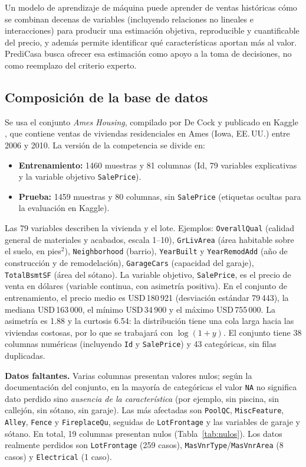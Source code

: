 \documentclass[journal]{IEEEtran}
\begin{document}
Un modelo de aprendizaje de máquina puede aprender de ventas históricas cómo se combinan decenas de variables (incluyendo relaciones no lineales e interacciones) para producir una estimación objetiva, reproducible y cuantificable del precio, y además permite identificar qué características aportan más al valor. PrediCasa busca ofrecer esa estimación como apoyo a la toma de decisiones, no como reemplazo del criterio experto.

\subsection{Composición de la base de datos}
Se usa el conjunto \textit{Ames Housing}, compilado por De Cock \cite{decock2011} y publicado en Kaggle \cite{kaggle}, que contiene ventas de viviendas residenciales en Ames (Iowa, EE.\,UU.) entre 2006 y 2010. La versión de la competencia se divide en:
\begin{itemize}
\item \textbf{Entrenamiento:} 1460 muestras y 81 columnas (Id, 79 variables explicativas y la variable objetivo \texttt{SalePrice}).
\item \textbf{Prueba:} 1459 muestras y 80 columnas, sin \texttt{SalePrice} (etiquetas ocultas para la evaluación en Kaggle).
\end{itemize}
Las 79 variables describen la vivienda y el lote. Ejemplos: \texttt{OverallQual} (calidad general de materiales y acabados, escala 1--10), \texttt{GrLivArea} (área habitable sobre el suelo, en pies$^2$), \texttt{Neighborhood} (barrio), \texttt{YearBuilt} y \texttt{YearRemodAdd} (año de construcción y de remodelación), \texttt{GarageCars} (capacidad del garaje), \texttt{TotalBsmtSF} (área del sótano). La variable objetivo, \texttt{SalePrice}, es el precio de venta en dólares (variable continua, con asimetría positiva). En el conjunto de entrenamiento, el precio medio es USD\,180\,921 (desviación estándar 79\,443), la mediana USD\,163\,000, el mínimo USD\,34\,900 y el máximo USD\,755\,000. La asimetría es 1.88 y la curtosis 6.54: la distribución tiene una cola larga hacia las viviendas costosas, por lo que se trabajará con $\log(1+y)$. El conjunto tiene 38 columnas numéricas (incluyendo \texttt{Id} y \texttt{SalePrice}) y 43 categóricas, sin filas duplicadas.

\textbf{Datos faltantes.} Varias columnas presentan valores nulos; según la documentación del conjunto, en la mayoría de categóricas el valor \texttt{NA} no significa dato perdido sino \textit{ausencia de la característica} (por ejemplo, sin piscina, sin callejón, sin sótano, sin garaje). Las más afectadas son \texttt{PoolQC}, \texttt{MiscFeature}, \texttt{Alley}, \texttt{Fence} y \texttt{FireplaceQu}, seguidas de \texttt{LotFrontage} y las variables de garaje y sótano. En total, 19 columnas presentan nulos (Tabla~\ref{tab:nulos}). Los datos realmente perdidos son \texttt{LotFrontage} (259 casos), \texttt{MasVnrType}/\texttt{MasVnrArea} (8 casos) y \texttt{Electrical} (1 caso).
\end{document}
